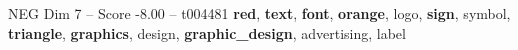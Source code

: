 \begin{textsample}{NEG Dim 7 – Score -8.00 – t004481}  \label{ex:f7_neg_009}
\textbf{red}, \textbf{text}, \textbf{font}, \textbf{orange}, logo, \textbf{sign}, symbol, \textbf{triangle}, \textbf{graphics}, design, \textbf{graphic\_design}, advertising, label

\end{textsample}
